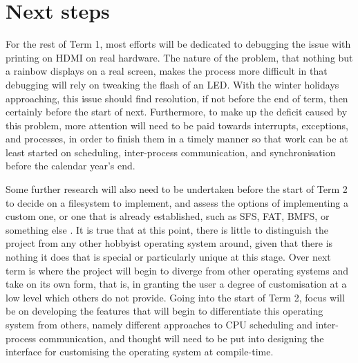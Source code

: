 \documentclass[10pt,a4paper]{article}
\begin{document}
\section*{Next steps}
For the rest of Term 1, most efforts will be dedicated to debugging the issue
with printing on HDMI on real hardware. The nature of the problem, that nothing
but a rainbow displays on a real screen, makes the process more difficult in
that debugging will rely on tweaking the flash of an LED. With the winter
holidays approaching, this issue should find resolution, if not before the end
of term, then certainly before the start of next. Furthermore, to make up the
deficit caused by this problem, more attention will need to be paid towards
interrupts, exceptions, and processes, in order to finish them in a timely
manner so that work can be at least started on scheduling, inter-process
communication, and synchronisation before the calendar year's end.

Some further research will also need to be undertaken before the start of Term 2
to decide on a filesystem to implement, and assess the options of implementing a
custom one, or one that is already established, such as SFS, FAT, BMFS, or
something else \cite{Filesystems}. It is true that at this point, there is
little to distinguish the project from any other hobbyist operating system
around, given that there is nothing it does that is special or particularly
unique at this stage. Over next term is where the project will begin to diverge
from other operating systems and take on its own form, that is, in granting the
user a degree of customisation at a low level which others do not provide. Going
into the start of Term 2, focus will be on developing the features that will
begin to differentiate this operating system from others, namely different
approaches to CPU scheduling and inter-process communication, and thought will
need to be put into designing the interface for customising the operating system
at compile-time.
\end{document}
